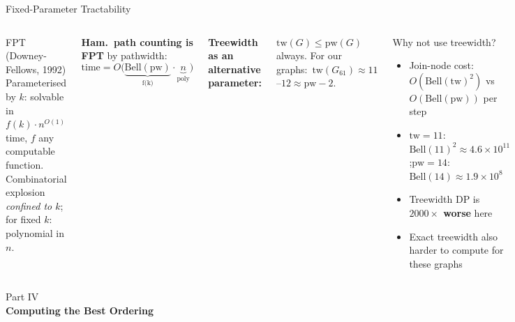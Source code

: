 \documentclass[aspectratio=169,t]{beamer}
\newcommand{\pw}{\mathrm{pw}}
\newcommand{\tw}{\mathrm{tw}}
\newcommand{\Bell}{\mathrm{Bell}}
\begin{document}
\begin{frame}{Fixed-Parameter Tractability}
\small
\begin{columns}[c]
\begin{block}{FPT (Downey-Fellows, 1992)}
Parameterised by $k$: solvable in $f(k)\cdot n^{O(1)}$ time,
$f$ any computable function.\\[2pt]
Combinatorial explosion \emph{confined to $k$};
for fixed $k$: polynomial in $n$.
\end{block}

\vspace{0.1cm}
\textbf{Ham.\ path counting is FPT} by pathwidth:
\[
  \text{time} = O\bigl(\underbrace{\Bell(\pw)}_{\text{f(k)}} \cdot \underbrace{n}_{\text{poly}}\bigr)
\]

\textbf{Treewidth as an alternative parameter:}

\vspace{0.1cm}
$\tw(G) \le \pw(G)$ always. For our graphs:\
$\tw(G_{61}) \approx 11$--$12 \approx \pw - 2$.

\vspace{0.15cm}
\begin{alertblock}{Why not use treewidth?}
\begin{itemize}\small
  \item Join-node cost: $O(\Bell(\tw)^2)$ vs $O(\Bell(\pw))$ per step
  \item $\tw=11$: $\Bell(11)^2 \approx 4.6 \times 10^{11}$;\quad $\pw=14$: $\Bell(14) \approx 1.9 \times 10^8$
  \item Treewidth DP is \textbf{$2000\times$ worse} here
  \item Exact treewidth also harder to compute for these graphs
\end{itemize}
\end{alertblock}
\end{columns}
\end{frame}

{
\begin{frame}[plain]
  \vspace{2cm}
  \begin{center}
    {\color{lightblue}\small Part IV}\\[0.4cm]
    {\color{white}\LARGE\bfseries Computing the Best Ordering}
  \end{center}
\end{frame}
}
\end{document}
